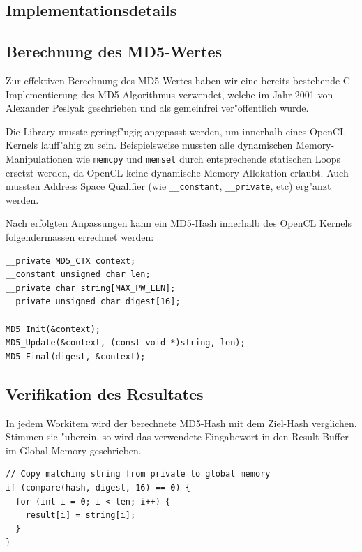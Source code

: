 \begin{refsection}
\section{Implementationsdetails}

\subsection{Berechnung des MD5-Wertes}
\label{crypto:md5lib}

Zur effektiven Berechnung des MD5-Wertes haben wir eine bereits bestehende
C-Implementierung des MD5-Algorithmus verwendet\cite{crypto:md5_impl}, welche im
Jahr 2001 von Alexander Peslyak geschrieben und als gemeinfrei ver"offentlich
wurde.

Die Library musste geringf"ugig angepasst werden, um innerhalb eines OpenCL
Kernels lauff"ahig zu sein. Beispielsweise mussten alle dynamischen
Memory-Manipulationen wie \texttt{memcpy} und \texttt{memset} durch
entsprechende statischen Loops ersetzt werden, da OpenCL keine dynamische
Memory-Al\-lo\-ka\-ti\-on erlaubt. Auch mussten Address Space Qualifier (wie
\texttt{\_\_constant}, \texttt{\_\_private}, etc) erg"anzt werden.

Nach erfolgten Anpassungen kann ein MD5-Hash innerhalb des OpenCL Kernels
folgendermassen errechnet werden:

\begin{small}
\begin{verbatim}
__private MD5_CTX context;
__constant unsigned char len;
__private char string[MAX_PW_LEN];
__private unsigned char digest[16];

MD5_Init(&context);
MD5_Update(&context, (const void *)string, len);
MD5_Final(digest, &context);
\end{verbatim}
\end{small}

\subsection{Verifikation des Resultates}
\label{crypto:verifikation}

In jedem Workitem wird der berechnete MD5-Hash mit dem Ziel-Hash verglichen.
Stimmen sie "uberein, so wird das verwendete Eingabewort in den Result-Buffer im
Global Memory geschrieben.

\begin{small}
\begin{verbatim}
// Copy matching string from private to global memory
if (compare(hash, digest, 16) == 0) {
  for (int i = 0; i < len; i++) {
    result[i] = string[i];
  }
}
\end{verbatim}
\end{small}


\end{refsection}
